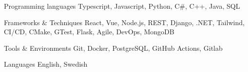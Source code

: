 
\begin{cvskills}

  \cvskill
    {Programming languages} %
    {Typescript, Javascript, Python, C\#, C++, Java, SQL} %

  \cvskill
    {Frameworks \& Techniques} %
    {React, Vue, Node.js, REST, Django, .NET, Tailwind, CI/CD, CMake, GTest, Flask, Agile, DevOps, MongoDB} %

  \cvskill
    {Tools \& Environments} %
    {Git, Docker, PostgreSQL, GitHub Actions, Gitlab} %

  \cvskill
    {Languages} %
    {English, Swedish} %

\end{cvskills}
